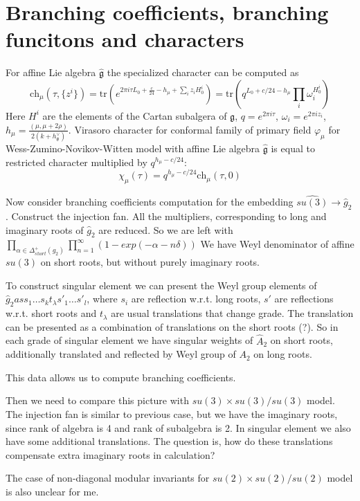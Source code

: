 \documentclass[12pt]{article}
\newcommand{\gf}{\mathfrak{g}}
\newcommand{\gfh}{\hat{\mathfrak{g}}}
\begin{document}
\section{Branching coefficients, branching funcitons and characters}
\label{sec:branch-coeff-branch}

For affine Lie algebra $\gfh$ the specialized character can be computed as
\begin{equation}
  \label{eq:1}
  \mathrm{ch}_{\mu} (\tau, \{z^i \}) = \mathrm{tr}\left( e^{2\pi i \tau L_0
    +\frac{c}{24} - h_{\mu } + \sum_i z_i H^i_0} \right)= \mathrm{tr} \left(
  q^{L_0 +c/24-h_{\mu}} \prod_i \omega_i^{H^i_0}\right)
\end{equation}
Here $H^i$ are the elements of the Cartan subalgera of $\gf$, $q=e^{2\pi i
  \tau}$, $\omega_i = e^{2\pi i z_i}$, $h_{\mu} = \frac{(\mu,\mu+2\rho)}{2(k+h^{\vee}_{\gf})}$. 
Virasoro character for conformal family of primary field $\varphi_{\mu}$ for Wess-Zumino-Novikov-Witten model with affine Lie
algebra $\gfh$ is equal to restricted character multiplied by
$q^{h_{\mu}-c/24}$:
\begin{equation}
  \label{eq:2}
  \chi_{\mu} (\tau) = q^{h_{\mu}-c/24} \mathrm{ch} _\mu (\tau,0)
\end{equation}

Now consider branching coefficients computation for the embedding
$\hat{su(3)}\to \hat g_2$. Construct the injection
fan. All the multipliers, corresponding to long and imaginary roots of
$\hat g_2$ are reduced. So we are left with
$\prod_{\alpha\in \Delta^+_{short} (g_2)}\prod_{n=1}^{\infty}
(1-exp(-\alpha - n\delta))$
We have Weyl denominator of affine $su(3)$ on short roots, but without
purely imaginary roots.

To construct singular element we can present the Weyl group elements
of $\hat g_2 as s_1\dots s_k t_{\lambda} s'_1\dots s'_l$,
where $s_i$ are reflection w.r.t. long roots, $s'$ are reflections w.r.t.
short roots and $t_{\lambda}$ are usual translations
that change grade. The translation can be presented as a combination
of translations on the short roots (?).
So in each grade of singular element we have singular weights of $\hat
A_2$ on short roots, additionally
translated and reflected by Weyl group of $A_2$ on long roots.

This data allows us to compute branching coefficients.

Then we need to compare this picture with $su(3)\times su(3)/su(3)$
model. The injection fan is similar to previous
case, but we have the imaginary roots, since rank of algebra is 4 and
rank of subalgebra is 2.
In singular element we also have some additional translations. The
question is, how do these translations compensate
extra imaginary roots in calculation?

The case of non-diagonal modular invariants for $su(2)\times
su(2)/su(2)$ model is also unclear for me.

{}

\end{document}
